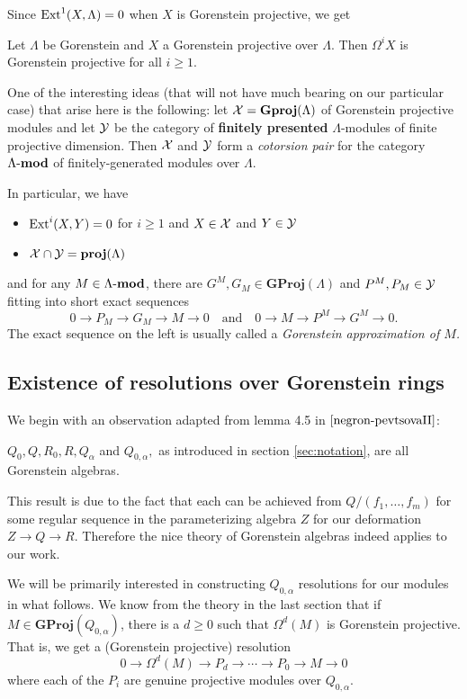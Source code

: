 \documentclass [11pt, proquest] {uwthesis}[2020/02/24]
\begin{document}
    Since $\operatorname{Ext}^1(X,\Lambda)=0$ when $X$ is Gorenstein projective, we get
    \begin{prop}
        Let $\Lambda$ be Gorenstein and $X$ a Gorenstein projective over $\Lambda.$ Then $\Omega^iX$ is Gorenstein projective for all $i\ge 1.$
    \end{prop}
    
    One of the interesting ideas (that will not have much bearing on our particular case) that arise here is the following: let $\mathcal{X}=\mathbf{Gproj}(\Lambda)$ of Gorenstein projective modules and let $\mathcal{Y}$ be the category of \textbf{finitely presented} $\Lambda$-modules of finite projective dimension. Then $\mathcal{X}$ and $\mathcal{Y}$ form a \textit{cotorsion pair} for the category $\Lambda\text{-}\mathbf{mod}$ of finitely-generated modules over $\Lambda.$
    
    In particular, we have
    \begin{itemize}
        \item $\operatorname{Ext}^i(X,Y)=0$ for $i\ge 1$ and $X\in\mathcal{X}$ and $Y\in\mathcal{Y}$
        \item $\mathcal{X}\cap\mathcal{Y}=\mathbf{proj}(\Lambda)$
    \end{itemize}
    and for any $M\in\Lambda\text{-}\mathbf{mod}$, there are $G^M,G_M\in\mathbf{GProj}(\Lambda)$ and $P^M,P_M\in\mathcal{Y}$
    fitting into short exact sequences
    \[0\to P_M\to G_M\to M\to 0\quad\text{and}\quad 0\to M\to P^M\to G^M\to 0.\]
    The exact sequence on the left is usually called a \textit{Gorenstein approximation of $M$.}

\subsection{Existence of resolutions over Gorenstein rings}\label{subsubsec:construction-of-res}
    We begin with an observation adapted from lemma 4.5 in $\cite{negron-pevtsovaII}$:
    \begin{cor}
        $Q_0,Q,R_0,R,Q_\alpha$ and $Q_{0,\alpha},$ as introduced in section \ref{sec:notation}, are all Gorenstein algebras. 
    \end{cor}
    This result is due to the fact that each can be achieved from $Q/(f_1,\dots,f_m)$ for some regular sequence in the parameterizing algebra $Z$ for our deformation $Z\to Q\to R.$ Therefore the nice theory of Gorenstein algebras indeed applies to our work.
    
    We will be primarily interested in constructing $Q_{0,\alpha}$ resolutions for our modules in what follows. We know from the theory in the last section that if $M\in\mathbf{GProj}(Q_{0,\alpha})$, there is a $d\ge 0$ such that $\Omega^{d}(M)$ is Gorenstein projective. That is, we get a (Gorenstein projective) resolution
    \[0\to\Omega^d(M)\to P_d\to \cdots\to P_0\to M\to 0\]
    where each of the $P_i$ are genuine projective modules over $Q_{0,\alpha}$. 
    
\end{document}
